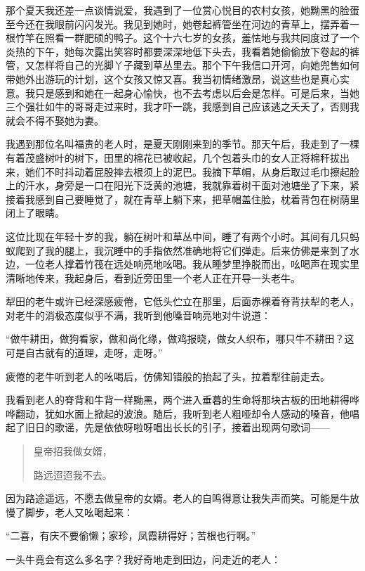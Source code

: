 \documentclass[12pt,UTF8]{ctexbook}
\begin{document}
那个夏天我还差一点谈情说爱，我遇到了一位赏心悦目的农村女孩，她黝黑的脸蛋至今还在我眼前闪闪发光。我见到她时，她卷起裤管坐在河边的青草上，摆弄着一根竹竿在照看一群肥硕的鸭子。这个十六七岁的女孩，羞怯地与我共同度过了一个炎热的下午，她每次露出笑容时都要深深地低下头去，我看着她偷偷放下卷起的裤管，又怎样将自己的光脚丫子藏到草丛里去。那个下午我信口开河，向她兜售如何带她外出游玩的计划，这个女孩又惊又喜。我当初情绪激昂，说这些也是真心实意。我只是感到和她在一起身心愉快，也不去考虑以后会是怎样。可是后来，当她三个强壮如牛的哥哥走过来时，我才吓一跳，我感到自己应该逃之夭夭了，否则我就会不得不娶她为妻。

我遇到那位名叫福贵的老人时，是夏天刚刚来到的季节。那天午后，我走到了一棵有着茂盛树叶的树下，田里的棉花已被收起，几个包着头巾的女人正将棉秆拔出来，她们不时抖动着屁股摔去根须上的泥巴。我摘下草帽，从身后取过毛巾擦起脸上的汗水，身旁是一口在阳光下泛黄的池塘，我就靠着树干面对池塘坐了下来，紧接着我感到自己要睡觉了，就在青草上躺下来，把草帽盖住脸，枕着背包在树荫里闭上了眼睛。

这位比现在年轻十岁的我，躺在树叶和草丛中间，睡了有两个小时。其间有几只蚂蚁爬到了我的腿上，我沉睡中的手指依然准确地将它们弹走。后来仿佛是来到了水边，一位老人撑着竹筏在远处响亮地吆喝。我从睡梦里挣脱而出，吆喝声在现实里清晰地传来，我起身后，看到近旁田里一个老人正在开导一头老牛。

犁田的老牛或许已经深感疲倦，它低头伫立在那里，后面赤裸着脊背扶犁的老人，对老牛的消极态度似乎不满，我听到他嗓音响亮地对牛说道：

“做牛耕田，做狗看家，做和尚化缘，做鸡报晓，做女人织布，哪只牛不耕田？这可是自古就有的道理，走呀，走呀。”

疲倦的老牛听到老人的吆喝后，仿佛知错般的抬起了头，拉着犁往前走去。

我看到老人的脊背和牛背一样黝黑，两个进入垂暮的生命将那块古板的田地耕得哗哗翻动，犹如水面上掀起的波浪。随后，我听到老人粗哑却令人感动的嗓音，他唱起了旧日的歌谣，先是依依呀啦呀唱出长长的引子，接着出现两句歌词——

\begin{quotation}
皇帝招我做女婿，

路远迢迢我不去。
\end{quotation}

因为路途遥远，不愿去做皇帝的女婿。老人的自鸣得意让我失声而笑。可能是牛放慢了脚步，老人又吆喝起来：

“二喜，有庆不要偷懒；家珍，凤霞耕得好；苦根也行啊。”

一头牛竟会有这么多名字？我好奇地走到田边，问走近的老人：
\end{document}
